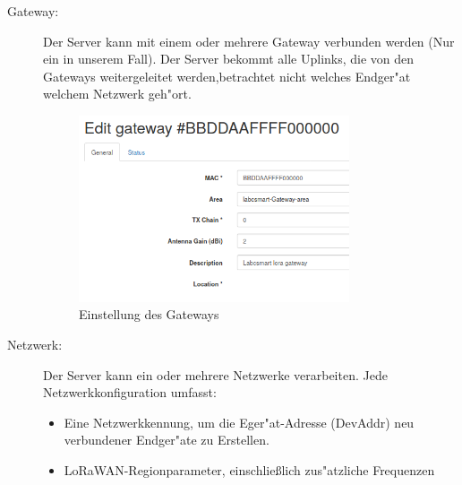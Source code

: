 \begin{description}
	\item[Gateway:] Der Server kann mit einem oder mehrere Gateway
	verbunden werden (Nur ein in unserem Fall). Der Server bekommt alle
	Uplinks, die von den Gateways weitergeleitet werden,betrachtet nicht
	welches Endger"at welchem Netzwerk geh"ort.
	\vspace{10cm}
	\begin{figure}[h]
		\centering
		\includegraphics[width=8cm]{source/images/Gateway}
		\caption{Einstellung des Gateways\label{fig:gateway}}
	\end{figure}

	\item[Netzwerk:] Der Server kann ein oder mehrere Netzwerke
	 verarbeiten. Jede Netzwerkkonfiguration umfasst:
	\begin{itemize}
		\item Eine Netzwerkkennung, um die Eger"at-Adresse (DevAddr) neu
		verbundener Endger"ate zu Erstellen.
		\item LoRaWAN-Regionparameter, einschlie\ss{}lich zus"atzliche
		Frequenzen
	\end{itemize}


\end{description}
